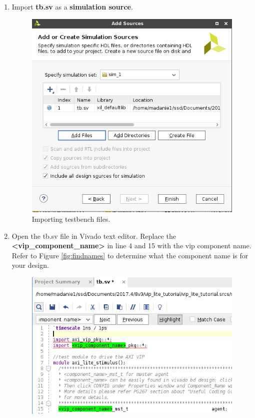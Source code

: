 \documentclass[11pt]{article}
\begin{document}
\begin{enumerate}
	\item Import \textbf{tb.sv} as a \textbf{simulation source}. 	
		\begin{figure}[H]
		  \centering
		  \includegraphics[scale=0.4]{addsimfiles.png}
		  \caption{Importing testbench files.}
		  \label{fig:addsimfilespng}
		\end{figure}
	\item Open the tb.sv file in Vivado text editor. Replace the \textbf{\textless vip\_component\_name\textgreater} in line 4 and 15 with the vip component name. Refer to Figure \ref{fig:findnames} to determine what the component name is for your design.
		\begin{figure}[H]
		  \centering
		  \includegraphics[scale=0.5]{componentname1.png}

\end{figure}
\end{enumerate}
\end{document}
